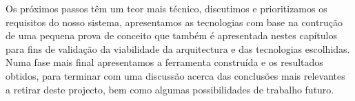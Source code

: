 \indent Os próximos passos têm um teor mais técnico, discutimos e prioritizamos os requisitos do nosso sistema, apresentamos as tecnologias com base na contrução de uma pequena prova de conceito que também é apresentada nestes capítulos para fins de validação da viabilidade da arquitectura e das tecnologias escolhidas. Numa fase mais final apresentamos a ferramenta construída e os resultados obtidos, para terminar com uma discussão acerca das conclusões mais relevantes a retirar deste projecto, bem como algumas possibilidades de trabalho futuro.

